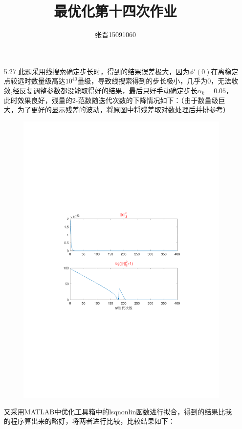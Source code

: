 \documentclass[UTF8]{ctexart}
\title{\heiti 最优化第十四次作业}
\author{\kaishu 张晋15091060}
\begin{document}
\maketitle
\begin{enumerate}
\item[5.27]
此题采用线搜索确定步长时，得到的结果误差极大，因为$\phi'(0)$在离稳定点较远时数量级高达$10^{40}$量级，导致线搜索得到的步长极小，几乎为0，无法收敛,经反复调整参数都没能取得好的结果，最后只好手动确定步长$\alpha_k=0.05$，此时效果良好，残量的2-范数随迭代次数的下降情况如下：（由于数量级巨大，为了更好的显示残差的波动，将原图中将残差取对数处理后并排参考）

\begin{figure}[H]
\centering
\includegraphics[width=12cm]{1.pdf}
\end{figure}



又采用MATLAB中优化工具箱中的lsqnonlin函数进行拟合，得到的结果比我的程序算出来的略好，将两者进行比较，比较结果如下：


\end{enumerate}
\end{document}

